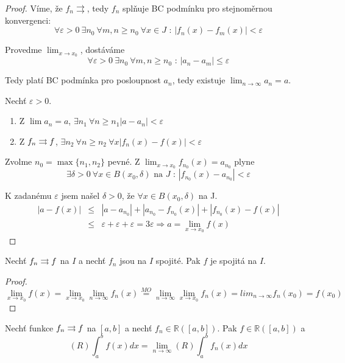 \begin{proof}
Víme, že $f_n \rightrightarrows$, tedy $f_n$ splňuje BC podmínku pro stejnoměrnou konvergenci:
$$\forall \varepsilon > 0 \ \exists n_0 \ \forall m,n \geq n_0 \ \forall x \in J \textrm{ : } |f_n(x) - f_m(x)| < \varepsilon $$

Provedme $\lim_{x \to x_0}$, dostáváme 
$$\forall \varepsilon>0 \ \exists n_0 \ \forall m,n \geq n_0 \textrm{ : } |a_n - a_m| \leq \varepsilon$$

Tedy platí BC podmínka pro posloupnost $a_n$, tedy existuje $\lim_{n \to \infty}a_n = a$.

Nechť $\varepsilon > 0$. 
\begin{enumerate}
\item Z $\lim a_n = a$, $ \exists n_1 \ \forall n \geq n_1 |a - a_n| < \varepsilon $
\item Z $f_n \rightrightarrows f$, $ \exists n_2 \ \forall n \geq n_2 \ \forall x |f_n(x) - f(x)| < \varepsilon$
\end{enumerate}

Zvolme $n_0 = \max \{n_1,n_2\}$ pevné. Z $\lim_{x \to x_0}f_{n_0}(x) = a_{n_0}$ plyne 
$$\exists \delta > 0 \ \forall x \in B(x_0,\delta) \textrm{ na } J \textrm{ : } |f_{n_0}(x) - a_{n_0}| < \varepsilon$$

K zadanému $\varepsilon$ jsem našel $\delta > 0$, že $\forall x \in B(x_0, \delta)$ na J.
\begin{eqnarray*}
|a - f(x)| & \leq & |a - a_{n_0}| + |a_{n_0} - f_{n_0}(x)| + |f_{n_0}(x) - f(x)| \\
& \leq & \varepsilon + \varepsilon + \varepsilon = 3\varepsilon \Rightarrow a=\lim_{x \to x_0}f(x)
\end{eqnarray*}

\end{proof}

\begin{dusledek}
Nechť $f_n \rightrightarrows f$ na $I$ a nechť $f_n$ jsou na $I$ spojité. Pak $f$ je spojitá na $I$.
\end{dusledek}
\begin{proof}
$$\lim_{x \to x_0}f(x) = \lim_{x \to x_0} \lim_{n \to \infty}f_n(x) \overset{MO}{=} \lim_{n \to \infty}\lim_{x \to x_0}f_n(x)=lim_{n \to \infty}f_n(x_0) = f(x_0)$$
\end{proof}

\begin{vetal}
Nechť funkce $f_n \rightrightarrows f$ na $[a,b]$ a nechť $f_n \in \mathbb{R} ([a,b])$. Pak $f \in \mathbb{R}([a,b])$ a 
$$(R) \int_a^b f(x) dx = \lim_{n \rightarrow \infty} (R) \int_a^b f_n(x) dx$$
\end{vetal}

